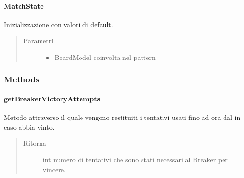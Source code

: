 \documentclass[letterpaper,10pt,italian,openany,oneside]{sphinxmanual}
\begin{document}
\paragraph{MatchState}
\label{\detokenize{source/it/unicam/cs/pa/mastermind/gamecore/MatchState:id1}}

\begin{fulllineitems}
\label{\detokenize{source/it/unicam/cs/pa/mastermind/gamecore/MatchState:it.unicam.cs.pa.mastermind.gamecore.MatchState.MatchState()}}
Inizializzazione con valori di default.
\begin{quote}\begin{description}
\item[{Parametri}] \leavevmode\begin{itemize}
\item {} 
 \textendash{} BoardModel coinvolta nel pattern 

\end{itemize}

\end{description}\end{quote}

\end{fulllineitems}



\subsubsection{Methods}
\label{\detokenize{source/it/unicam/cs/pa/mastermind/gamecore/MatchState:methods}}

\paragraph{getBreakerVictoryAttempts}
\label{\detokenize{source/it/unicam/cs/pa/mastermind/gamecore/MatchState:getbreakervictoryattempts}}

\begin{fulllineitems}
\label{\detokenize{source/it/unicam/cs/pa/mastermind/gamecore/MatchState:it.unicam.cs.pa.mastermind.gamecore.MatchState.getBreakerVictoryAttempts()}}
Metodo attraverso il quale vengono restituiti i tentativi usati fino ad ora dal  in caso abbia vinto.
\begin{quote}\begin{description}
\item[{Ritorna}] \leavevmode
int numero di tentativi che sono stati necessari al Breaker per vincere.

\end{description}\end{quote}

\end{fulllineitems}
\end{document}
